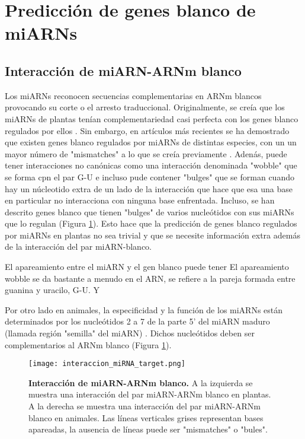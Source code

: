 \section{Predicción de genes blanco de miARNs}

\subsection{Interacción de miARN-ARNm blanco}

Los miARNs reconocen secuencias complementarias en ARNm blancos provocando su corte o el arresto traduccional.
Originalmente, se creía que los miARNs de plantas tenían complementariedad casi perfecta con los genes blanco regulados por ellos \citep{pmid19167326,pmid12869753,pmid12242443}.
Sin embargo, en artículos más recientes se ha demostrado que existen genes blanco regulados por miARNs de distintas especies, con un un mayor número de "mismatches" a lo que se creía previamente \citep{German2008}.
Adenás, puede tener interacciones no canónicas como una interacción denominada "wobble" que se forma cpn el par G-U e incluso pude contener "bulges" que se forman cuando hay un núcleotido extra de un lado de la interacción que hace que esa una base en particular no interacciona con ninguna base enfrentada.
Incluso, se han descrito genes blanco que tienen "bulges" de varios nucleótidos con sus miARNs que lo regulan \citep{pmid24561804} (Figura \ref{fig:interaccion_miRNA_target}).
Esto hace que la predicción de genes blanco regulados por miARNs en plantas no sea trivial y que se necesite información extra además de la interacción del par miARN-blanco.

El apareamiento entre el miARN y el gen blanco puede tener 
El apareamiento wobble se da bastante a menudo en el ARN, se refiere a la pareja formada entre guanina y uracilo, G-U.
Y 

Por otro lado en animales, la especificidad y la función de los miARNs están determinados por los nucleótidos 2 a 7 de la parte 5' del miARN maduro (llamada región "semilla" del miARN) \citep{pmid12672692}.
Dichos nucleótidos deben ser complementarios al ARNm blanco (Figura \ref{fig:interaccion_miRNA_target}).

\begin{figure}[htbp!] 
	\centering    
	\texttt{[image: interaccion\_miRNA\_target.png]}
	\caption[Interacción de miARN-ARNm blanco]{
		\textbf{Interacción de miARN-ARNm blanco.}
        A la izquierda se muestra una interacción del par miARN-ARNm blanco en plantas.
        A la derecha se muestra una interacción del par miARN-ARNm blanco en animales.
        Las líneas verticales grises representan bases apareadas, la ausencia de líneas puede ser "mismatches" o "bules".
	}
	\label{fig:interaccion_miRNA_target}
\end{figure}


